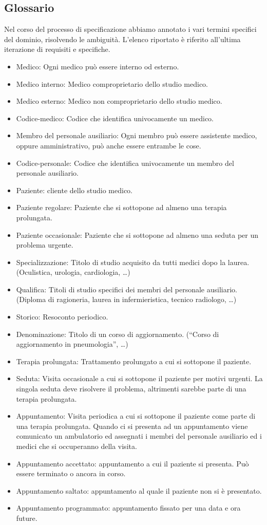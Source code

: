 \documentclass[11pt]{article}
\begin{document}
\subsection{Glossario}
Nel corso del processo di specificazione abbiamo annotato i vari termini specifici del
dominio, risolvendo le ambiguità. L'elenco riportato è riferito all'ultima iterazione di
requisiti e specifiche.
\begin{itemize}
\item Medico: Ogni medico può essere interno od esterno.
\item Medico interno: Medico comproprietario dello studio medico.
\item Medico esterno: Medico non comproprietario dello studio medico.
\item Codice-medico: Codice che identifica univocamente un medico.
\item Membro del personale ausiliario: Ogni membro può essere assistente medico, oppure amministrativo, può anche essere entrambe le cose.
\item Codice-personale: Codice che identifica univocamente un membro del personale ausiliario.
\item Paziente: cliente dello studio medico.
\item Paziente regolare: Paziente che si sottopone ad almeno una terapia prolungata.
\item Paziente occasionale: Paziente che si sottopone ad almeno una seduta per un problema urgente.
\item Specializzazione: Titolo di studio acquisito da tutti medici dopo la laurea. (Oculistica, urologia, cardiologia, …)
\item Qualifica: Titoli di studio specifici dei membri del personale ausiliario. (Diploma di ragioneria, laurea in infermieristica, tecnico radiologo, …)
\item Storico: Resoconto periodico.
\item Denominazione: Titolo di un corso di aggiornamento. (“Corso di aggiornamento in pneumologia”, …)
\item Terapia prolungata: Trattamento prolungato a cui si sottopone il paziente.
\item Seduta: Visita occasionale a cui si sottopone il paziente per motivi urgenti. La singola seduta deve risolvere il problema, altrimenti sarebbe parte di una terapia prolungata.
\item Appuntamento: Visita periodica a cui si sottopone il paziente come parte di una terapia prolungata. Quando ci si presenta ad un appuntamento viene comunicato un ambulatorio ed assegnati i membri del personale ausiliario ed i medici che si occuperanno della visita.
\item Appuntamento accettato: appuntamento a cui il paziente si presenta. Può essere terminato o ancora in corso.
\item Appuntamento saltato: appuntamento al quale il paziente non si è presentato.
\item Appuntamento programmato: appuntamento fissato per una data e ora future.
\end{itemize}
\end{document}

